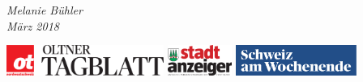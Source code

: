 \begin{titlepage}
  \setlength{\fboxsep}{50pt}
  \setlength{\fboxrule}{3pt}

  \vfill
  \vfill

  \begin{minipage}{\textwidth}
    \begin{center}
      \vspace*{4cm}
    \end{center}
  \end{minipage}

  \vfill

  \begin{minipage}{\textwidth}
    \begin{center}
      \Large{\textit{Melanie Bühler}}\\
      \Large{\textit{März 2018}}\\
    \end{center}
  \end{minipage}

  \vfill

  \begin{minipage}{\textwidth}
    \begin{center}
      \includegraphics[height=1cm]{Bilder/Logo/Oltnertagblatt.pdf}
      \quad
      \includegraphics[height=1cm]{Bilder/Logo/Stadtanzeiger_Olten_Schrift.pdf}
      \quad
      \includegraphics[height=1cm]{Bilder/Logo/SaW_Logo_V2.pdf}
    \end{center}
  \end{minipage}

\end{titlepage}
\newpage
